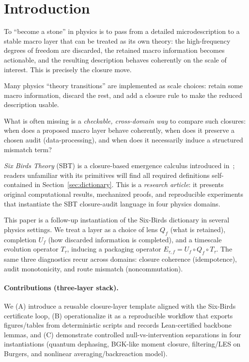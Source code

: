 \documentclass[11pt]{article}
\providecommand{\Qf}{Q_f}
\providecommand{\Uf}{U_f}
\providecommand{\Etauf}{E_{\tau,f}}
\begin{document}
 \section{Introduction}
\label{sec:introduction}

To ``become a stone'' in physics is to pass from a detailed microdescription to a stable macro layer that can be treated as its own theory: the high-frequency degrees of freedom are discarded, the retained macro information becomes actionable, and the resulting description behaves coherently on the scale of interest. This is precisely the closure move.

Many physics ``theory transitions'' are implemented as scale choices: retain some macro information, discard the rest, and add a closure rule to make the reduced description usable.

What is often missing is a \emph{checkable, cross-domain way} to compare such closures: when does a proposed macro layer behave coherently, when does it preserve a chosen audit (data-processing), and when does it necessarily induce a structured mismatch term?

\emph{Six Birds Theory} (SBT) is a closure-based emergence calculus introduced in~\citep{SixBirdsFramework}; readers unfamiliar with its primitives will find all required definitions self-contained in Section~\ref{sec:dictionary}. This is a \emph{research article}: it presents original computational results, mechanized proofs, and reproducible experiments that instantiate the SBT closure-audit language in four physics domains.

This paper is a follow-up instantiation of the Six-Birds dictionary in several physics settings. We treat a layer as a choice of lens $\Qf$ (what is retained), completion $\Uf$ (how discarded information is completed), and a timescale evolution operator $T_\tau$, inducing a packaging operator $\Etauf=\Uf\circ\Qf\circ T_\tau$. The same three diagnostics recur across domains: closure coherence (idempotence), audit monotonicity, and route mismatch (noncommutation).

\paragraph{Contributions (three-layer stack).}
We (A) introduce a reusable closure-layer template aligned with the Six-Birds certificate loop, (B) operationalize it as a reproducible workflow that exports figures/tables from deterministic scripts and records Lean-certified backbone lemmas, and (C) demonstrate controlled null-vs-intervention separations in four instantiations (quantum dephasing, BGK-like moment closure, filtering/LES on Burgers, and nonlinear averaging/backreaction model).
\end{document}
